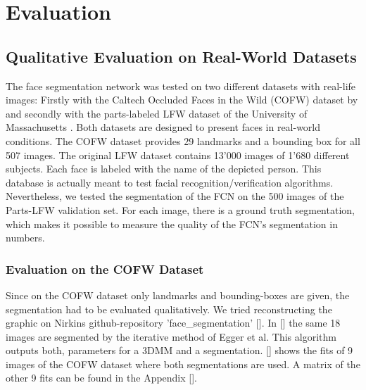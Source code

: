 
\chapter{Evaluation}
\section{Qualitative Evaluation on Real-World Datasets}
\label{sec:EvaluationOnDatasets} %
The face segmentation network was tested on two different datasets with real-life images: Firstly with the Caltech Occluded Faces in the Wild (COFW) dataset by \cite{cofw} and secondly with the parts-labeled LFW dataset of the University of Massachusetts \cite{LFW_dataset}. Both datasets are designed to present faces in real-world conditions. The COFW dataset provides 29 landmarks and a bounding box for all 507 images. The original LFW dataset contains 13'000 images of 1'680 different subjects. Each face is labeled with the name of the depicted person. This database is actually meant to test facial recognition/verification algorithms. Nevertheless, we tested the segmentation of the FCN on the 500 images of the Parts-LFW validation set. For each image, there is a ground truth segmentation, which makes it possible to measure the quality of the FCN's segmentation in numbers.
\\
\subsection{Evaluation on the COFW Dataset}
Since on the COFW dataset only landmarks and bounding-boxes are given, the segmentation had to be evaluated qualitatively. We tried reconstructing the graphic on Nirkins \cite{nirkin2018_faceswap} github-repository 'face\_segmentation' []. In  [] the same 18 images are segmented by the iterative method of Egger et al. This algorithm outputs both, parameters for a 3DMM and a segmentation. [] shows the fits of 9 images of the COFW dataset where both segmentations are used. A matrix of the other 9 fits can be found in the Appendix [].

